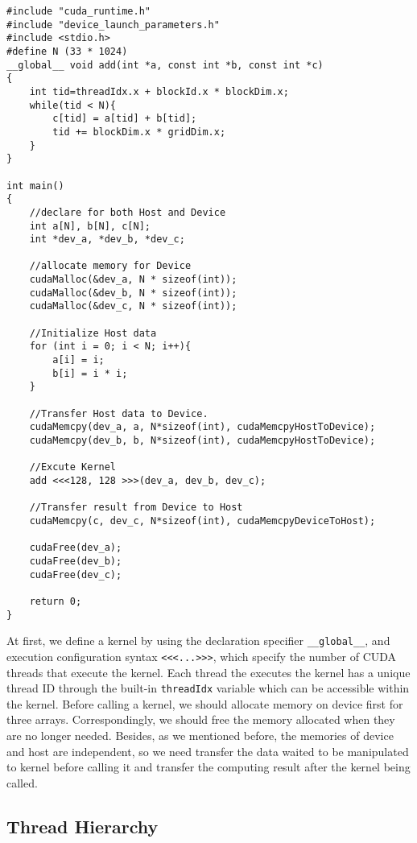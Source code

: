 \begin{lstlisting}
#include "cuda_runtime.h"
#include "device_launch_parameters.h"
#include <stdio.h>
#define N (33 * 1024)
__global__ void add(int *a, const int *b, const int *c)
{
	int tid=threadIdx.x + blockId.x * blockDim.x;
	while(tid < N){
		c[tid] = a[tid] + b[tid];
		tid += blockDim.x * gridDim.x;
	}
}

int main()
{
	//declare for both Host and Device
	int a[N], b[N], c[N];
	int *dev_a, *dev_b, *dev_c;
	
	//allocate memory for Device
	cudaMalloc(&dev_a, N * sizeof(int));
	cudaMalloc(&dev_b, N * sizeof(int));
	cudaMalloc(&dev_c, N * sizeof(int));
	
	//Initialize Host data
	for (int i = 0; i < N; i++){
		a[i] = i;
		b[i] = i * i;
	}
	
	//Transfer Host data to Device.
	cudaMemcpy(dev_a, a, N*sizeof(int), cudaMemcpyHostToDevice);
	cudaMemcpy(dev_b, b, N*sizeof(int), cudaMemcpyHostToDevice);
	
	//Excute Kernel
	add <<<128, 128 >>>(dev_a, dev_b, dev_c);
	
	//Transfer result from Device to Host
	cudaMemcpy(c, dev_c, N*sizeof(int), cudaMemcpyDeviceToHost);
	
	cudaFree(dev_a);
	cudaFree(dev_b);
	cudaFree(dev_c);
	
	return 0;
}
\end{lstlisting}

At first, we define a kernel by using the declaration specifier \lstinline|__global__|, and execution configuration syntax \lstinline|<<<...>>>|, which specify the number of CUDA threads that execute the kernel. Each thread the executes the kernel has a unique thread ID through the built-in \lstinline|threadIdx| variable which can be accessible within the kernel. Before calling a kernel, we should allocate memory on device first for three arrays. Correspondingly, we should free the memory allocated when they are no longer needed. Besides, as we mentioned before, the memories of device and host are independent, so we need transfer the data waited to be manipulated to kernel before calling it and transfer the computing result after the kernel being called.

\subsection{Thread Hierarchy}

